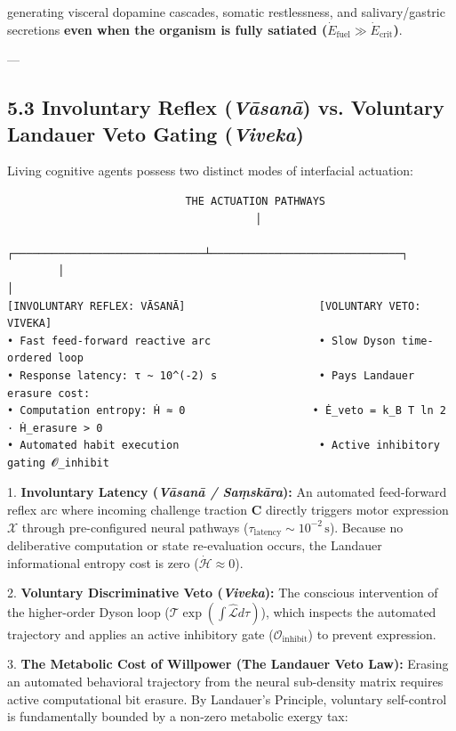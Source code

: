 \documentclass[11pt,a4paper]{article}
\theoremstyle{definition}
\theoremstyle{remark}
\begin{document}
  generating visceral dopamine cascades, somatic restlessness, and salivary/gastric secretions \textbf{even when the organism is fully satiated ($\dot{E}_{\text{fuel}} \gg \dot{E}_{\text{crit}}$)}.

---

\subsection{5.3 Involuntary Reflex (\textit{Vāsanā}) vs. Voluntary Landauer Veto Gating (\textit{Viveka})}
Living cognitive agents possess two distinct modes of interfacial actuation:

\begin{verbatim}
                            THE ACTUATION PATHWAYS
                                       │
        ┌──────────────────────────────┴──────────────────────────────┐
        │                                                             │
[INVOLUNTARY REFLEX: VĀSANĀ]                     [VOLUNTARY VETO: VIVEKA]
• Fast feed-forward reactive arc                 • Slow Dyson time-ordered loop
• Response latency: τ ~ 10^(-2) s                • Pays Landauer erasure cost:
• Computation entropy: Ḣ ≈ 0                    • Ė_veto = k_B T ln 2 · Ḣ_erasure > 0
• Automated habit execution                      • Active inhibitory gating 𝓞_inhibit
\end{verbatim}

1. \textbf{Involuntary Latency (\textit{Vāsanā / Saṃskāra}):}  
   An automated feed-forward reflex arc where incoming challenge traction $\mathbf{C}$ directly triggers motor expression $\boldsymbol{\mathcal{X}}$ through pre-configured neural pathways ($\tau_{\text{latency}} \sim 10^{-2}\,\mathrm{s}$). Because no deliberative computation or state re-evaluation occurs, the Landauer informational entropy cost is zero ($\dot{\mathcal{H}} \approx 0$).

2. \textbf{Voluntary Discriminative Veto (\textit{Viveka}):}  
   The conscious intervention of the higher-order Dyson loop ($\mathcal{T}\exp(\int \hat{\mathcal{L}} d\tau)$), which inspects the automated trajectory and applies an active inhibitory gate ($\mathcal{O}_{\text{inhibit}}$) to prevent expression.

3. \textbf{The Metabolic Cost of Willpower (The Landauer Veto Law):}  
   Erasing an automated behavioral trajectory from the neural sub-density matrix requires active computational bit erasure. By Landauer's Principle, voluntary self-control is fundamentally bounded by a non-zero metabolic exergy tax:
   
\end{document}
